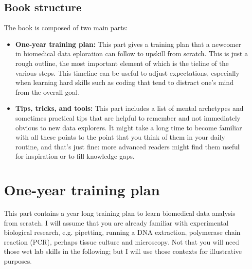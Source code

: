 \documentclass[12pt,a4paper,notitlepage,onecolumn]{article}
\begin{document}
\subsection*{Book structure}
The book is composed of two main parts:
\begin{itemize}
\item \textbf{One-year training plan:} This part gives a training plan that a newcomer in biomedical data eploration can follow to upskill from scratch. This is just a rough outline, the most important element of which is the tieline of the various steps. This timeline can be useful to adjust expectations, especially when learning hard skills such as coding that tend to distract one's mind from the overall goal.
\item \textbf{Tips, tricks, and tools:} This part includes a list of mental archetypes and sometimes practical tips that are helpful to remember and not immediately obvious to new data explorers. It might take a long time to become familiar with all these points to the point that you think of them in your daily routine, and that's just fine: more advanced readers might find them useful for inspiration or to fill knowledge gaps.
\end{itemize}


\section{One-year training plan}
This part contains a year long training plan to learn biomedical data analysis from scratch. I will assume that you are already familiar with experimental biological research, e.g. pipetting, running a DNA extraction, polymerase chain reaction (PCR), perhaps tissue culture and microscopy. Not that you will need those wet lab skills in the following; but I will use those contexts for illustrative purposes.
\end{document}

